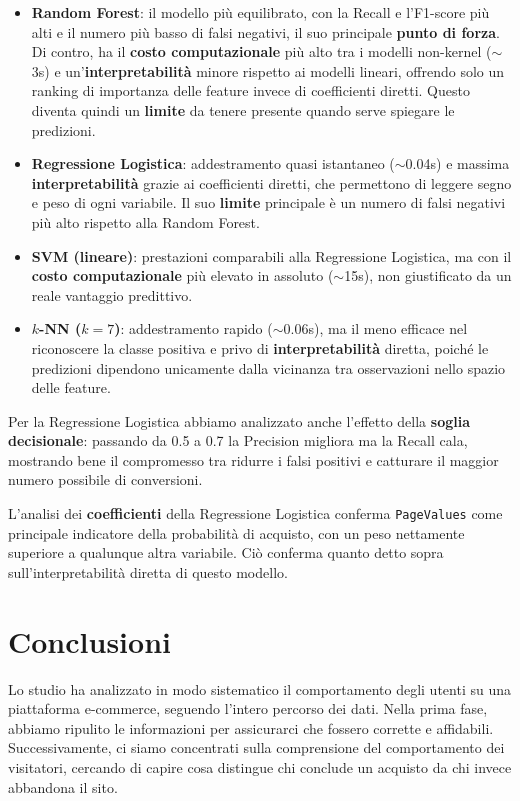 \documentclass[11pt,a4paper]{article}
\begin{document}
\begin{itemize}
    \item \textbf{Random Forest}: il modello più equilibrato, con la Recall e l'F1-score
    più alti e il numero più basso di falsi negativi, il suo principale
    \textbf{punto di forza}. Di contro, ha il \textbf{costo computazionale} più alto tra i
    modelli non-kernel ($\sim$3s) e un'\textbf{interpretabilità} minore rispetto ai modelli
    lineari, offrendo solo un ranking di importanza delle feature invece di coefficienti
    diretti. Questo diventa quindi un \textbf{limite} da tenere presente quando serve spiegare le predizioni.
    \item \textbf{Regressione Logistica}: addestramento quasi istantaneo ($\sim$0.04s) e
    massima \textbf{interpretabilità} grazie ai coefficienti diretti, che permettono di
    leggere segno e peso di ogni variabile. Il suo \textbf{limite} principale è un numero
    di falsi negativi più alto rispetto alla Random Forest.
    \item \textbf{SVM (lineare)}: prestazioni comparabili alla Regressione Logistica, ma
    con il \textbf{costo computazionale} più elevato in assoluto ($\sim$15s), non
    giustificato da un reale vantaggio predittivo.
    \item \textbf{$k$-NN ($k=7$)}: addestramento rapido ($\sim$0.06s), ma il meno efficace
    nel riconoscere la classe positiva e privo di \textbf{interpretabilità} diretta, poiché
    le predizioni dipendono unicamente dalla vicinanza tra osservazioni nello spazio delle
    feature.
\end{itemize}

Per la Regressione Logistica abbiamo analizzato anche l'effetto della \textbf{soglia
decisionale}: passando da 0.5 a 0.7 la Precision migliora ma la Recall cala, mostrando
bene il compromesso tra ridurre i falsi positivi e catturare il maggior numero possibile
di conversioni.

L'analisi dei \textbf{coefficienti} della Regressione Logistica conferma
\texttt{PageValues} come principale indicatore della probabilità di acquisto, con un peso
nettamente superiore a qualunque altra variabile. Ciò conferma quanto detto
sopra sull'interpretabilità diretta di questo modello.

\section{Conclusioni}
\label{sec: Conclusioni}
Lo studio ha analizzato in modo sistematico il comportamento degli utenti su una piattaforma e-commerce, seguendo l'intero percorso dei dati. Nella prima fase, abbiamo ripulito le informazioni per assicurarci che fossero corrette e affidabili. Successivamente, ci siamo concentrati sulla comprensione del comportamento dei visitatori, cercando di capire cosa distingue chi conclude un acquisto da chi invece abbandona il sito.
\end{document}
